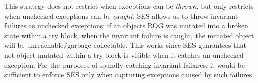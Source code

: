 
\noindent This strategy does not restrict when exceptions can be \emph{thrown}, but only restricts when unchecked exceptions can be \emph{caught}.
SES allows us to throw invariant failures as unchecked exceptions: if an objects ROG was mutated into a broken state within a try block, when the invariant failure is caught, the mutated object will be unreachable/garbage-collectable. This works since SES guarantees that not object mutated within a try block is visible when it catches an unchecked exception.
For the purposes of soundly catching invariant failures, it would be sufficient to enforce SES only when capturing exceptions caused by such failures.





% 


